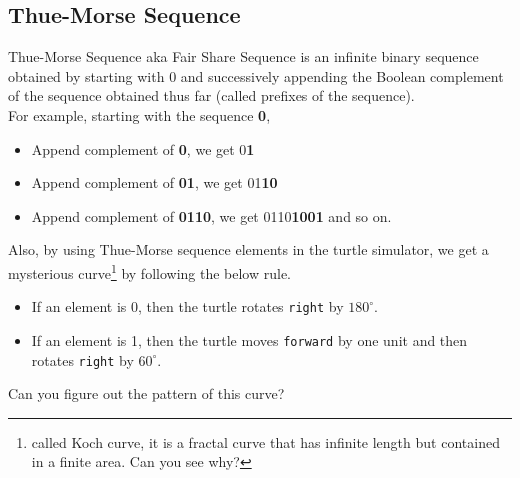 \documentclass[../../Problems]{subfiles}
\begin{document}
\recalctypearea
\subsection{Thue-Morse Sequence}{\label{pp:thuemorsesequence}}
Thue-Morse Sequence aka Fair Share Sequence is an infinite binary sequence obtained by starting with 0 and successively appending the Boolean complement of the sequence obtained thus far (called prefixes of the sequence).\\
For example, starting with the sequence \textbf{0},
\begin{itemize}
	\item Append complement of \textbf{0}, we get 0\textbf{1}
	\item Append complement of \textbf{01}, we get 01\textbf{10}
	\item Append complement of \textbf{0110}, we get 0110\textbf{1001} and so on.
\end{itemize}
Also, by using Thue-Morse sequence elements in the turtle simulator, we get a mysterious curve\footnote{called Koch curve, it is a fractal curve that has infinite length but contained in a finite area. Can you see why?} by following the below rule.
\begin{itemize}
	\item If an element is 0, then the turtle rotates \verb!right! by $180^\circ$.
	\item If an element is 1, then the turtle moves \verb!forward! by one unit and then rotates \verb!right! by $60^\circ$.
\end{itemize}
Can you figure out the pattern of this curve?
\end{document}
